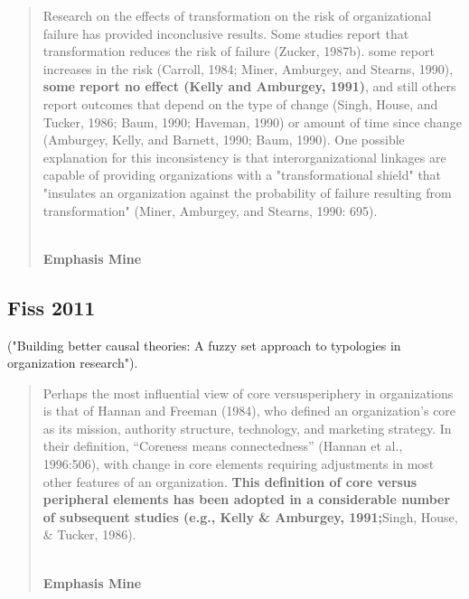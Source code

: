 \begin{quote}
Research on the effects of transformation on the risk of organizational failure has provided inconclusive results. Some studies report that transformation reduces the risk of failure (Zucker, 1987b). some report increases in the risk (Carroll, 1984; Miner, Amburgey, and Stearns, 1990), \textbf{some report no effect (Kelly and Amburgey, 1991)}, and still others report outcomes that depend on the type of change (Singh, House, and Tucker, 1986; Baum, 1990; Haveman, 1990) or amount of time since change (Amburgey, Kelly, and Barnett, 1990; Baum, 1990). One possible explanation for this inconsistency is that interorganizational linkages are capable of providing organizations with a "transformational shield" that "insulates an organization against the probability of failure resulting from transformation" (Miner, Amburgey, and Stearns, 1990: 695).
\begin{flushright}
\cite[p.194]{baum1991institutional} \\
\textbf{Emphasis Mine}
\end{flushright}
\end{quote}

\subsection{Fiss 2011}

\cite{fiss2011building} ("Building better causal theories: A fuzzy set approach to typologies in organization research").\\

\begin{quote}
Perhaps the most influential view of core versusperiphery  in  organizations  is  that  of  Hannan  and Freeman  (1984),  who  defined  an  organization’s core as its mission, authority structure, technology, and marketing strategy. In their definition, “Coreness  means  connectedness”  (Hannan  et  al.,  1996:506),  with  change  in  core  elements  requiring  adjustments in most other features of an organization. \textbf{This definition of core versus peripheral elements has been adopted in a considerable number of subsequent  studies  (e.g.,  Kelly  \&  Amburgey,  1991;}Singh, House, \& Tucker, 1986).
\begin{flushright}
\cite[p.397]{fiss2011building} \\
\textbf{Emphasis Mine}
\end{flushright}
\end{quote}

